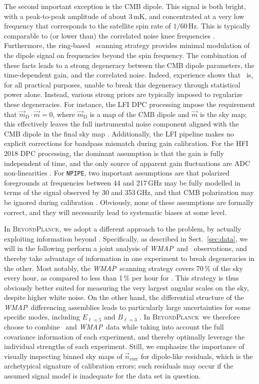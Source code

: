 \documentclass[twocolumn]{aa}
\def\WMAP{\emph{WMAP}}
\newcommand{\n}[0]{\vec{n}}
\newcommand{\m}[0]{\vec{m}}
\newcommand{\BP}{\textsc{BeyondPlanck}}
\newcommand{\npipe}[0]{\texttt{NPIPE}}
\begin{document}
The second important exception is the CMB dipole. This signal is both
bright, with a peak-to-peak amplitude of about 3\,mK, and concentrated
at a very low frequency that corresponds to the satellite spin rate of
$1/60\,$Hz. This is typically comparable to (or lower than) the
correlated noise knee frequencies \citep{planck2016-l02}. Furthermore,
the ring-based \Planck\ scanning strategy provides minimal modulation
of the dipole signal on frequencies beyond the spin frequency. The
combination of these facts leads to a strong degeneracy between the
CMB dipole parameters, the time-dependent gain, and the correlated
noise. Indeed, experience shows that \Planck\ is, for all practical
purposes, unable to break this degeneracy through statistical power
alone. Instead, various strong priors are typically imposed to
regularize these degeneracies. For instance, the LFI DPC processing
impose the requirement that $\m_{\mathrm{D}}\cdot\m=0$, where
$\m_{\mathrm{D}}$ is a map of the CMB dipole and $\m$ is the sky map;
this effectively leaves the full instrumental noise component aligned
with the CMB dipole in the final sky map
\citep{planck2014-a06}. Additionally, the LFI pipeline makes no
explicit corrections for bandpass mismatch during gain
calibration. For the HFI 2018 DPC processing, the dominant assumption
is that the gain is fully independent of time, and the only source of
apparent gain fluctuations are ADC non-linearities
\citep{planck2016-l03}. For \npipe, two important assumptions are that
polarized foregrounds at frequencies between 44 and 217\,GHz may be
fully modelled in terms of the signal observed by 30 and 353\,GHz, and
that CMB polarization may be ignored during calibration
\citep{planck2020-LVII}. Obviously, none of these assumptions are formally
correct, and they will necessarily lead to systematic biases at some
level.

In \BP, we adopt a different approach to the problem, by actually
exploiting information beyond \Planck. Specifically, as described in
Sect.~\ref{sec:data}, we will in the following perform a joint
analysis of \WMAP\ and \Planck\ observations, and thereby take
advantage of information in one experiment to break degeneracies in
the other. Most notably, the \WMAP\ scanning strategy covers 70\,\% of
the sky every hour, as compared to less than 1\,\% per hour for
\Planck. This strategy is thus obviously better suited for measuring
the very largest angular scales on the sky, despite higher white
noise. On the other hand, the differential structure of the
\WMAP\ differencing assemblies leads to particularly large
uncertainties for some specific modes, including $E_{\ell=5}$ and
$B_{\ell=3}$ \citep{jarosik2010}. In \BP\ we therefore choose to
combine \Planck\ and \WMAP\ data while taking into account the full
covariance information of each experiment, and thereby optimally
leverage the individual strengths of each experiment. Still, we
emphasize the importance of visually inspecting binned sky maps of
$\n_{\mathrm{corr}}$ for dipole-like residuals, which is the
archetypical signature of calibration errors; such residuals may occur
if the assumed signal model is inadequate for the data set in
question.
\end{document}
